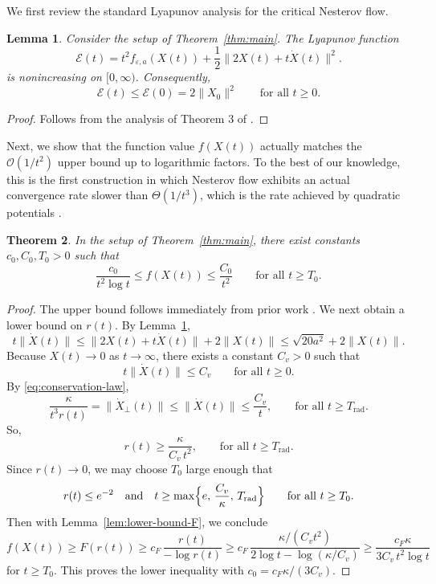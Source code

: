 \documentclass{article}
\newtheorem{theorem}{Theorem}[section]
\newtheorem{lemma}[theorem]{Lemma}
\theoremstyle{remark}
\begin{document}
We first review the standard Lyapunov analysis for the critical Nesterov flow.
\begin{lemma}\label{lem:energy-eps}
Consider the setup of Theorem~\ref{thm:main}.
The Lyapunov function
\begin{equation*}
  \mathcal{E}(t)=
  t^2 f_{\varepsilon,a}(X (t))
  +\frac12\|2X (t)+t\dot X (t)\|^2.
\end{equation*}
is nonincreasing on $[0,\infty)$. Consequently,
\[
    \mathcal{E}(t)\le \mathcal{E}(0)=2\| X_0\|^2
  \qquad\text{for all }t\ge0.
\]
\end{lemma}
\begin{proof}
Follows from the analysis of Theorem 3 of \cite{SuBoydCandes2016}.
\end{proof}


Next, we show that the function value $f(X(t))$ actually matches the $\mathcal{O}(1/t^2)$ upper bound up to logarithmic factors. To the best of our knowledge, this is the first construction in which Nesterov flow exhibits an actual convergence rate slower than $\Theta(1/t^3)$, which is the rate achieved by quadratic potentials \cite[Section 3.2]{SuBoydCandes2016}.

\begin{theorem}\label{prop:objective-bounds}
In the setup of Theorem~\ref{thm:main}, 
there exist constants $c_0,C_0,T_0>0$ such that
\[
  \frac{c_0}{t^2\log t}
  \le f(X(t))
  \le \frac{C_0}{t^2}
  \qquad\text{for all }t\ge T_0.
\]
\end{theorem}



\begin{proof}
The upper bound follows immediately from prior work \cite[Theorem~3]{SuBoydCandes2016}.
We next obtain a lower bound on $r(t)$. By Lemma~\ref{lem:energy-eps},
\[
  t\|\dot X(t)\|
  \le \| 2X(t)+t\dot X(t)\|+2\| X(t)\|
  \le \sqrt{20a^2}+2\| X(t)\|.
\]
Because $X(t)\to0$ as $t\to\infty$, there exists a constant $C_v>0$ such that
\[
   t\|\dot X(t)\|\le C_v
  \qquad\text{for all }t\ge0.
\]
By \eqref{eq:conservation-law},
\[
  \frac{\kappa}{t^3r(t)}
  =\|\dot X_\perp(t)\|
  \le \|\dot X(t)\|
  \le \frac{C_v}{t},
  \qquad\text{for all }t\ge T_\mathrm{rad}.
\]
So,
\[
    r(t)\ge \frac{\kappa}{C_v\,t^2},
  \qquad\text{for all }t\ge T_\mathrm{rad}.
\]
Since $r(t)\rightarrow 0$, we may choose $T_0$ large enough that 
\[
  r(t)\le e^{-2}\quad\text{and}\quad  t\ge \max\Bigl\{e,\,\frac{C_v}{\kappa},\,T_\mathrm{rad}\Bigr\}
  \qquad\text{for all }t\ge T_0.
\]
Then with Lemma~\ref{lem:lower-bound-F}, we conclude 
\[
  f(X(t))
  \ge F(r(t))
  \ge c_F\,\frac{r(t)}{-\log r(t)}
  \ge c_F\,\frac{\kappa/(C_v t^2)}{2\log t-\log(\kappa/C_v)}
  \ge \frac{c_F\kappa}{3C_v\,t^2\log t}
\]
for $t\ge T_0$.
This proves the lower inequality with $c_0=c_F\kappa/(3C_v)$.
\end{proof}
\end{document}
